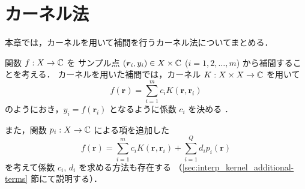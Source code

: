 %

\chapter{カーネル法}

本章では，カーネルを用いて補間を行うカーネル法についてまとめる．

関数 $f : X \to \mathbb{C}$ を
サンプル点 $(\bm{r}_i, y_i) \in X \times \mathbb{C}$ ($i = 1, 2, \ldots, m$) から補間することを考える．
カーネルを用いた補間では，カーネル $K : X \times X \to \mathbb{C}$ を用いて
\begin{equation}
    f(\bm{r}) = \sum_{i=1}^m c_i K(\bm{r}, \bm{r}_i)
\end{equation}
のようにおき，$y_i = f(\bm{r}_i)$ となるように係数 $c_i$ を決める
\cite{Fukumizu2010}．

また，関数 $p_i : X \to \mathbb{C}$ による項を追加した
\begin{equation}
    f(\bm{r}) = \sum_{i=1}^m c_i K(\bm{r}, \bm{r}_i) + \sum_{i=1}^Q d_i p_i(\bm{r})
\end{equation}
を考えて係数 $c_i$, $d_i$ を求める方法も存在する
（\ref{sec:interp_kernel_additional-terms} 節にて説明する）．







